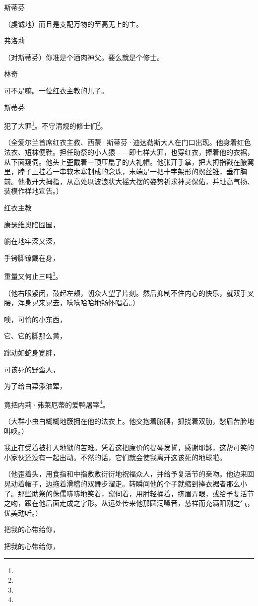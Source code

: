 \par 斯蒂芬
\par （虔诚地）而且是支配万物的至高无上的主。
\par 弗洛莉
\par （对斯蒂芬）你准是个酒肉神父。要么就是个修士。
\par 林奇
\par 可不是嘛。一位红衣主教的儿子。
\par 斯蒂芬
\par 犯了大罪\footnote{}。不守清规的修士们\footnote{}。
\par （全爱尔兰首席红衣主教、西蒙·斯蒂芬·迪达勒斯大人在门口出现。他身着红色法衣、短袜便鞋。担任助祭的小人猿——即七样大罪，也穿红衣，捧着他的衣裾，从下面窥伺。他头上歪戴着一顶压扁了的大礼帽。他张开手掌，把大拇指戳在腋窝里，脖子上挂着一串软木塞制成的念珠，末端是一把十字架形的螺丝锥，垂在胸前。他撒开大拇指，从高处以波浪状大摇大摆的姿势祈求神灵保佑，并趾高气扬、装模作样地宣告。）
\par 红衣主教
\par 康瑟维奥陷囹圄，
\par 躺在地牢深又深，
\par 手铐脚镣戴在身，
\par 重量又何止三吨\footnote{}。
\par （他右眼紧闭，鼓起左颊，朝众人望了片刻。然后抑制不住内心的快乐，就双手叉腰，浑身晃来晃去，嘻嘻哈哈地畅怀唱着。）
\par 噢，可怜的小东西，
\par 它、它的脚那么黄，
\par 蹿动如蛇身宽胖，
\par 可该死的野蛮人，
\par 为了给白菜添油荤，
\par 竟把内莉·弗莱厄蒂的爱鸭屠宰\footnote{}。
\par （大群小虫白糊糊地簇拥在他的法衣上。他交抱着胳膊，抓挠着双肋，愁眉苦脸地叫唤。）
\par 我正在受着被打入地狱的苦难。凭着这把廉价的提琴发誓，感谢耶稣，这帮可笑的小家伙还没有一起出动。不然的话，它们就会使我离开这该死的地球啦。
\par （他歪着头，用食指和中指敷敷衍衍地祝福众人，并给予复活节的亲吻。他边来回晃动着帽子，边拖着滑稽的双舞步溜走。转瞬间他的个子就缩到捧衣裾者那么小了。那些助祭的侏儒哧哧地笑着，窥伺着，用肘轻捅着，挤眉弄眼，或给予复活节之吻，跟在他后面走成之字形。从远处传来他那圆润嗓音，慈祥而充满阳刚之气，优美动听。）
\par 把我的心带给你，
\par 把我的心带给你，
